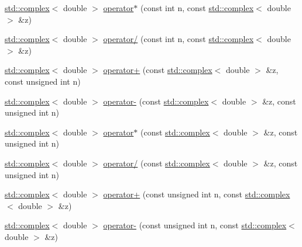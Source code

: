 \begin{DoxyCompactItemize}
\item 
\hyperlink{Constants_8h_a1c1b16cc02d518bbe753449171ab7033}{std\-::complex}$<$ double $>$ \hyperlink{complex__functions_8H_ad2a99ba6f8cbcfa34786720d898d3a15}{operator$\ast$} (const int n, const \hyperlink{Constants_8h_a1c1b16cc02d518bbe753449171ab7033}{std\-::complex}$<$ double $>$ \&z)
\item 
\hyperlink{Constants_8h_a1c1b16cc02d518bbe753449171ab7033}{std\-::complex}$<$ double $>$ \hyperlink{complex__functions_8H_adaf90bd37c6c210dd37b3d179de6a37d}{operator/} (const int n, const \hyperlink{Constants_8h_a1c1b16cc02d518bbe753449171ab7033}{std\-::complex}$<$ double $>$ \&z)
\item 
\hyperlink{Constants_8h_a1c1b16cc02d518bbe753449171ab7033}{std\-::complex}$<$ double $>$ \hyperlink{complex__functions_8H_a4da235186028d98c41171cfe6d73790f}{operator+} (const \hyperlink{Constants_8h_a1c1b16cc02d518bbe753449171ab7033}{std\-::complex}$<$ double $>$ \&z, const unsigned int n)
\item 
\hyperlink{Constants_8h_a1c1b16cc02d518bbe753449171ab7033}{std\-::complex}$<$ double $>$ \hyperlink{complex__functions_8H_a323f63d6e43c99afc23433fa3ee9d6c0}{operator-\/} (const \hyperlink{Constants_8h_a1c1b16cc02d518bbe753449171ab7033}{std\-::complex}$<$ double $>$ \&z, const unsigned int n)
\item 
\hyperlink{Constants_8h_a1c1b16cc02d518bbe753449171ab7033}{std\-::complex}$<$ double $>$ \hyperlink{complex__functions_8H_aa2211a65ba7d4eed25893303a444723d}{operator$\ast$} (const \hyperlink{Constants_8h_a1c1b16cc02d518bbe753449171ab7033}{std\-::complex}$<$ double $>$ \&z, const unsigned int n)
\item 
\hyperlink{Constants_8h_a1c1b16cc02d518bbe753449171ab7033}{std\-::complex}$<$ double $>$ \hyperlink{complex__functions_8H_afeea1b881b5c4326ec424ba27666d267}{operator/} (const \hyperlink{Constants_8h_a1c1b16cc02d518bbe753449171ab7033}{std\-::complex}$<$ double $>$ \&z, const unsigned int n)
\item 
\hyperlink{Constants_8h_a1c1b16cc02d518bbe753449171ab7033}{std\-::complex}$<$ double $>$ \hyperlink{complex__functions_8H_ad543d5f71b4bc18a5613c10cedc65f64}{operator+} (const unsigned int n, const \hyperlink{Constants_8h_a1c1b16cc02d518bbe753449171ab7033}{std\-::complex}$<$ double $>$ \&z)
\item 
\hyperlink{Constants_8h_a1c1b16cc02d518bbe753449171ab7033}{std\-::complex}$<$ double $>$ \hyperlink{complex__functions_8H_ac3ca236e0d83691f390e091e6855e442}{operator-\/} (const unsigned int n, const \hyperlink{Constants_8h_a1c1b16cc02d518bbe753449171ab7033}{std\-::complex}$<$ double $>$ \&z)

\end{DoxyCompactItemize}
